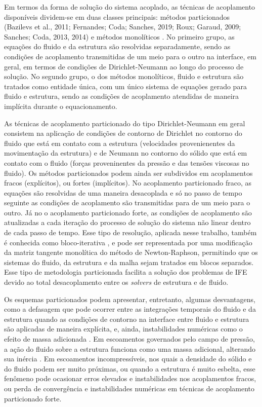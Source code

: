 Em termos da forma de solução do sistema acoplado, as técnicas de acoplamento disponíveis dividem-se em duas classes principais: métodos particionados (Bazilevs et al.,
2011; Fernandes; Coda; Sanches, 2019; Roux; Garaud, 2009; Sanches; Coda, 2013, 2014) e métodos monolíticos \cite{Avancini:2023,Blom:1998,Hubneretal:2004,HronM:2007}. No primeiro grupo, as equações do fluido e da estrutura são resolvidas separadamente, sendo as condições de acoplamento transmitidas de um meio para o outro na interface, em geral, em termos de condições de Dirichlet-Neumann ao longo do processo de solução. No segundo grupo, o dos métodos monolíticos, fluido e estrutura são tratados como entidade única, com um único sistema de equações gerado para fluido e estrutura, sendo as condições de acoplamento atendidas de maneira implícita durante o equacionamento.

As técnicas de acoplamento particionado do tipo Dirichlet-Neumann em geral consistem na aplicação de condições de contorno de Dirichlet no contorno do fluido que está em contato com a estrutura (velocidades provenienentes da movimentação da estrutura) e de Neumann no contorno do sólido que está em contato com o fluido (forças proveninentes da pressão e das tensões viscosas no fluido). Os métodos particionados podem ainda ser subdividos em acoplamentos fracos (explícitos), ou fortes (implícitos). No acoplamento particionado fraco, as equações são resolvidas de uma maneira desacoplada e só no passo de tempo seguinte as condições de acoplamento são transmitidas para de um meio para o outro. Já no o acoplamento particionado forte, as condições de acoplamento são atualizadas a cada iteração do processo de solução do sistema não linear dentro de cada passo de tempo. Esse tipo de resolução, aplicada nesse trabalho, também é conhecida como bloco-iterativa \cite{BazilevsTT:2013a}, e pode ser representada por uma  modificação da matriz tangente monolítica do método de Newton-Raphson, permitindo que os sistemas do fluido, da estrutura e da malha sejam tratados em blocos separados. Esse tipo de metodologia particionada facilita a solução dos problemas de IFE devido ao total desacoplamento entre os \textit{solvers} de estrutura e de fluido.

Os esquemas particionados podem apresentar, entretanto, algumas desvantagens, como a defasagem que pode ocorrer entre as integrações temporais do fluido e da estrutura quando as condições de contorno na interface entre fluido e estrutura são aplicadas de maneira explícita, e, ainda, instabilidades numéricas como o efeito de massa adicionada \cite{FelippaPF:2001}. Em escoamentos governados pelo campo de pressão, a ação do fluido sobre a estrutura funciona como uma massa adicional, alterando sua inércia \cite{TallecM:2001}. Em escoamentos incompressíveis, nos quais a densidade do sólido e do fluido podem ser muito próximas, ou quando a estrutura é muito esbelta, esse fenômeno pode ocasionar erros elevados e instabilidades nos acoplamentos fracos, ou  perda de convergência e instabilidades numéricas em técnicas de acoplamento particionado forte. 

